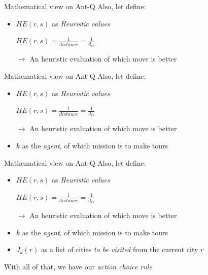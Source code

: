 \documentclass[aspectratio=169,xcolor=dvipsnames]{beamer}
\begin{document}
\begin{frame}{Mathematical view on Ant-Q}
    Also, let define:
    \begin{itemize}
        \item $HE(r, s)$ as \textit{Heuristic values}
        \begin{center}
            $HE(r, s) = \frac{1}{distance} = \frac{1}{d_{rs}}$
        \end{center}
        $\rightarrow$ An heuristic evaluation of which move is better
    \end{itemize}
\end{frame}

\begin{frame}{Mathematical view on Ant-Q}
    Also, let define:
    \begin{itemize}
        \item $HE(r, s)$ as \textit{Heuristic values}
        \begin{center}
            $HE(r, s) = \frac{1}{distance} = \frac{1}{d_{rs}}$
        \end{center}
        $\rightarrow$ An heuristic evaluation of which move is better
        \item $k$ as the \textit{agent}, of which mission is to make tours
    \end{itemize}
\end{frame}

\begin{frame}{Mathematical view on Ant-Q}
    Also, let define:
    \begin{itemize}
        \item $HE(r, s)$ as \textit{Heuristic values}
        \begin{center}
            $HE(r, s) = \frac{1}{distance} = \frac{1}{d_{rs}}$
        \end{center}
        $\rightarrow$ An heuristic evaluation of which move is better
        \item $k$ as the \textit{agent}, of which mission is to make tours
        \item $J_k(r)$ as a list of cities \textit{to be visited} from the current city $r$
    \end{itemize}
\end{frame}

\begin{frame}
    \huge\centering With all of that, we have our \textit{\alert{action choice rule}}
\end{frame}

\end{document}
